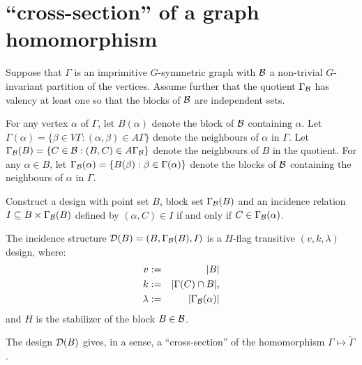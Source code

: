 


\section{``cross-section'' of a graph homomorphism}

Suppose that $\Gamma$ is an imprimitive $G$-symmetric graph
with $\mathcal{B}$ a non-trivial $G$-invariant partition of the vertices.
Assume further that the quotient $\Gamma_{\mathcal{B}}$ has valency
at least one so that the blocks of $\mathcal{B}$ are independent sets.

For any vertex $\alpha$ of $\Gamma$, let $B(\alpha)$ denote
the block of $\mathcal{B}$ containing $\alpha$.
Let $\Gamma(\alpha) = \{ \beta \in V \Gamma : (\alpha, \beta) \in A \Gamma \}$
denote the neighbours of $\alpha$ in $\Gamma$.
Let $\Gamma_{\mathcal{B}}(B) = \{ C \in \mathcal{B} : (B,C) \in A \Gamma_{\mathcal{B}} \}$
denote the neighbours of $B$ in the quotient.
For any $\alpha \in B$, let
$\Gamma_{\mathcal{B}}(\alpha) = \{ B(\beta) : \beta \in \Gamma(\alpha) \}$
denote the blocks of $\mathcal{B}$ containing the neighbours of $\alpha$ in $\Gamma$.

Construct a design with point set $B$, block set $\Gamma_{\mathcal{B}}(B)$
and an incidence relation $ I \subseteq B \times \Gamma_{\mathcal{B}}(B)$
defined by $(\alpha, C) \in I$ if and only if $C \in \Gamma_{\mathcal{B}}(\alpha)$.

\begin{proposition}
The incidence structure $\mathcal{D}(B) = (B, \Gamma_{\mathcal{B}}(B), I)$ is a $H$-flag transitive
$(v,k,\lambda)$ design, where:
\begin{eqnarray*}
v & := &  |B| \\
k & := &  |\Gamma(C) \cap B|, \\
\lambda  & := &  |\Gamma_{\mathcal{B}}(\alpha)| \\
\end{eqnarray*}
and $H$ is the stabilizer of the block $B \in \mathcal{B}$.
\end{proposition}
	      
The design $\mathcal{D}(B)$ gives, in a sense, a ``cross-section''
of the homomorphism $\Gamma \mapsto \widetilde{\Gamma}$.

